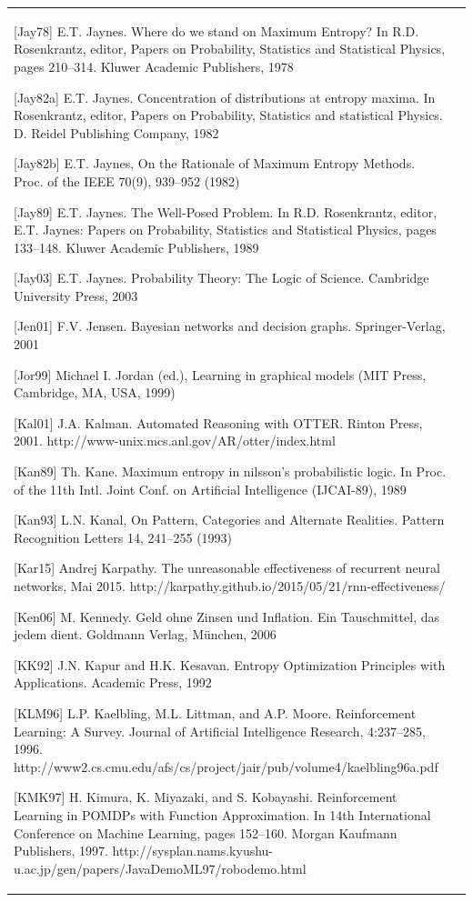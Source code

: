 \documentclass[10pt]{book}
\begin{document}
\begin{center}
\begin{tabular}{|l|l|}
[Jay78] E.T. Jaynes. Where do we stand on Maximum Entropy? In R.D. Rosenkrantz, editor, Papers on Probability, Statistics and Statistical Physics, pages 210–314. Kluwer Academic Publishers, 1978

[Jay82a] E.T. Jaynes. Concentration of distributions at entropy maxima. In Rosenkrantz, editor, Papers on Probability, Statistics and statistical Physics. D. Reidel Publishing Company, 1982

[Jay82b] E.T. Jaynes, On the Rationale of Maximum Entropy Methods. Proc. of the IEEE 70(9), 939–952 (1982)

[Jay89] E.T. Jaynes. The Well-Posed Problem. In R.D. Rosenkrantz, editor, E.T. Jaynes: Papers on Probability, Statistics and Statistical Physics, pages 133–148. Kluwer Academic Publishers, 1989

[Jay03] E.T. Jaynes. Probability Theory: The Logic of Science. Cambridge University Press, 2003

[Jen01] F.V. Jensen. Bayesian networks and decision graphs. Springer-Verlag, 2001

[Jor99] Michael I. Jordan (ed.), Learning in graphical models (MIT Press, Cambridge, MA, USA, 1999)

[Kal01] J.A. Kalman. Automated Reasoning with OTTER. Rinton Press, 2001. http://www-unix.mcs.anl.gov/AR/otter/index.html

[Kan89] Th. Kane. Maximum entropy in nilsson’s probabilistic logic. In Proc. of the 11th Intl. Joint Conf. on Artificial Intelligence (IJCAI-89), 1989

[Kan93] L.N. Kanal, On Pattern, Categories and Alternate Realities. Pattern Recognition Letters 14, 241–255 (1993)

[Kar15] Andrej Karpathy. The unreasonable effectiveness of recurrent neural networks, Mai 2015. http://karpathy.github.io/2015/05/21/rnn-effectiveness/

[Ken06] M. Kennedy. Geld ohne Zinsen und Inflation. Ein Tauschmittel, das jedem dient. Goldmann Verlag, München, 2006

[KK92] J.N. Kapur and H.K. Kesavan. Entropy Optimization Principles with Applications. Academic Press, 1992

[KLM96] L.P. Kaelbling, M.L. Littman, and A.P. Moore. Reinforcement Learning: A Survey. Journal of Artificial Intelligence Research, 4:237–285, 1996. http://www2.cs.cmu.edu/afs/cs/project/jair/pub/volume4/kaelbling96a.pdf

[KMK97] H. Kimura, K. Miyazaki, and S. Kobayashi. Reinforcement Learning in POMDPs with Function Approximation. In 14th International Conference on Machine Learning, pages 152–160. Morgan Kaufmann Publishers, 1997. http://sysplan.nams.kyushu-u.ac.jp/gen/papers/JavaDemoML97/robodemo.html


\end{tabular}
\end{center}
\end{document}
